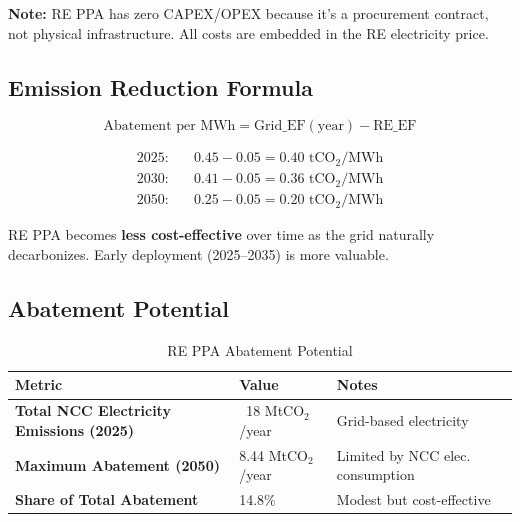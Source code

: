 \documentclass[11pt,a4paper]{report}
\newcommand{\mtco}{MtCO$_2$}
\newcommand{\tco}{tCO$_2$}
\begin{document}
\textbf{Note:} RE PPA has zero CAPEX/OPEX because it's a procurement contract, not physical infrastructure. All costs are embedded in the RE electricity price.

\subsection{Emission Reduction Formula}

\begin{equation}
\text{Abatement per MWh} = \text{Grid\_EF}(\text{year}) - \text{RE\_EF}
\end{equation}

\begin{align*}
\text{2025:} \quad & 0.45 - 0.05 = 0.40 \text{ \tco/MWh} \\
\text{2030:} \quad & 0.41 - 0.05 = 0.36 \text{ \tco/MWh} \\
\text{2050:} \quad & 0.25 - 0.05 = 0.20 \text{ \tco/MWh}
\end{align*}

\begin{tcolorbox}[colback=lightgray,colframe=darkblue,title=KEY INSIGHT]
RE PPA becomes \textbf{less cost-effective} over time as the grid naturally decarbonizes. Early deployment (2025--2035) is more valuable.
\end{tcolorbox}

\subsection{Abatement Potential}

\begin{table}[H]
\centering
\caption{RE PPA Abatement Potential}
\begin{tabular}{p{7cm}p{4cm}p{4cm}}
\toprule
\textbf{Metric} & \textbf{Value} & \textbf{Notes} \\
\midrule
\textbf{Total NCC Electricity Emissions (2025)} & ~18 \mtco/year & Grid-based electricity \\
\textbf{Maximum Abatement (2050)} & 8.44 \mtco/year & Limited by NCC elec. consumption \\
\textbf{Share of Total Abatement} & 14.8\% & Modest but cost-effective \\
\bottomrule
\end{tabular}
\label{tab:reppa-abatement}
\end{table}

\clearpage

\end{document}

